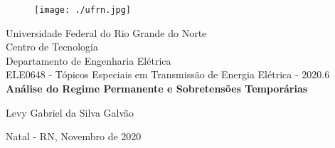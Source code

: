 \onehalfspacing
\begin{titlepage}
	\begin{center}
	
	\begin{figure}[!ht]
	\centering
	\texttt{[image: ./ufrn.jpg]}
	\end{figure}
		Universidade Federal do Rio Grande do Norte \\ Centro de Tecnologia \\ Departamento de Engenharia Elétrica \\ ELE0648 - Tópicos Especiais em Transmissão de Energia Elétrica  - 2020.6 \\
		\vspace{15pt}
        \vspace{95pt}
        \textbf{\Large{Análise do Regime Permanente e Sobretensões Temporárias}}\\
		\vspace{3,5cm}
	\end{center}
	
	\begin{flushright}
			\item Levy Gabriel da Silva Galvão 
 	\end{flushright}
	\vspace{1cm}
	
	\begin{center}
		\vspace{\fill}
		Natal - RN, Novembro de 2020
	\end{center}
\end{titlepage}




